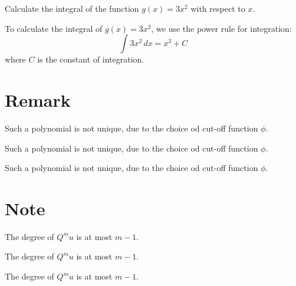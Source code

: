 \documentclass[fontset=none]{ctexart}
\begin{document}
\begin{problem*}
    Calculate the integral of the function $g(x) = 3x^2$ with respect to $x$.
\end{problem*}
\begin{solution*}
    To calculate the integral of $g(x) = 3x^2$, we use the power rule for integration:
    \[
        \int 3x^2 \, dx = x^3 + C
    \]
    where $C$ is the constant of integration.
\end{solution*}

\section{Remark}

\begin{remark}
    Such a polynomial is not unique, due to the choice od cut-off function $\phi$.
\end{remark}

\begin{remark}[xxx]
    Such a polynomial is not unique, due to the choice od cut-off function $\phi$.
\end{remark}

\begin{remark*}
    Such a polynomial is not unique, due to the choice od cut-off function $\phi$.
\end{remark*}

\section{Note}

\begin{note}
    The degree of $Q^m u$ is at most $m-1$.
\end{note}

\begin{note}[xxx]
    The degree of $Q^m u$ is at most $m-1$.
\end{note}

\begin{note*}
    The degree of $Q^m u$ is at most $m-1$.
\end{note*}


\end{document}
